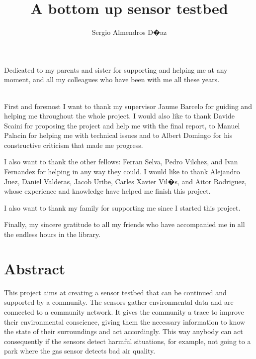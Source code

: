 \documentclass[12pt, a4paper,twoside]{tesi_upf}
\title{A bottom up sensor testbed}
\author{Sergio Almendros D�az}
\begin{document}
\pdfstringdefDisableCommands{%
\let\MakeUppercase\relax
}

\frontmatter

\maketitle

\cleardoublepage



\noindent Dedicated to my parents and sister for supporting and helping me at any moment, and all my colleagues who have been with me all these years.

\cleardoublepage




\\

	First and foremost I want to thank my supervisor Jaume Barcelo for guiding and helping me throughout the whole project. I would also like to thank Davide Scaini for proposing the project and help me with the final report, to Manuel Palacin for helping me with technical issues and to Albert Domingo for his constructive criticism that made me progress.

	I also want to thank the other fellows: Ferran Selva, Pedro Vilchez, and Ivan Fernandez for helping in any way they could. 
	I would like to thank Alejandro Juez, Daniel Valderas, Jacob Uribe, Carles Xavier Vil�s, and Aitor Rodriguez, whose experience and knowledge have helped me finish this project. 

	I also want to thank my family for supporting me since I started this project.

	Finally, my sincere gratitude to all my friends who have accompanied me in all the endless hours in the library.

\cleardoublepage


\section*{\Large \sffamily Abstract}
 
  This project aims at creating a sensor testbed that can be continued and supported by a community. 
  The sensors gather environmental data and are connected to a community network. It gives the community a trace to improve their environmental conscience, giving them the necessary information to know the state of their surroundings and act accordingly.
  This way anybody can act consequently if the sensors detect harmful situations, for example, not going to a park where the gas sensor detects bad air quality.
  
\end{document}
